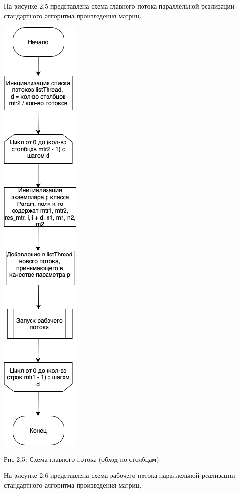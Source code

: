 \documentclass[12pt]{report}
\begin{document}
На рисунке 2.5 представлена схема главного потока параллельной реализации стандартного алгоритма произведения матриц.

\begin{center}
		\includegraphics[scale=0.5]{schema/ParColMain.png}
		
			Рис 2.5: Схема главного потока (обход по столбцам)
\end{center}

На рисунке 2.6 представлена схема рабочего потока параллельной реализации стандартного алгоритма произведения матриц.
\end{document}
